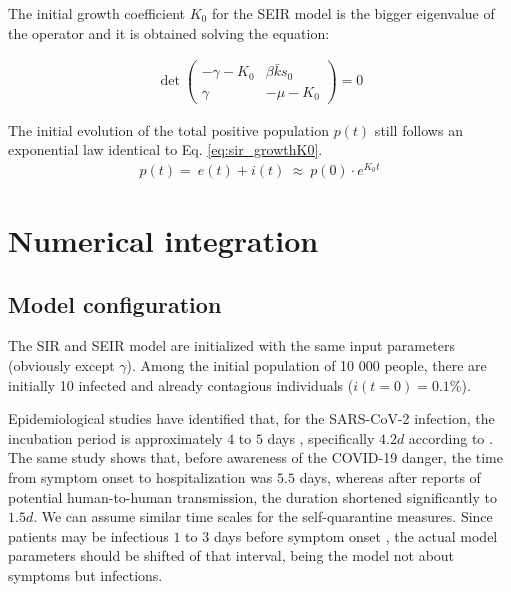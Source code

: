 \documentclass[DIV=12, BCOR=0pt]{scrartcl}  %
\begin{document}
The initial growth coefficient $K_0$ for the SEIR model is the bigger eigenvalue of the operator and it is obtained solving the equation: 

	\begin{align}
		\det 
		\begin{pmatrix}
			- \gamma - K_0 & \beta \bar{k} s_0\\ %
			\gamma & - \mu - K_0  %
		\end{pmatrix} = 0
	\label{eq:seir_K0}
	\end{align}
 
 The initial evolution of the total positive population $p(t)$ still follows an exponential law identical to Eq. \ref{eq:sir_growthK0}.
 \begin{align}
		p(t) = \ e(t) + i(t) \ \approx \  p(0) \cdot e^{K_0 t}
 \end{align}

 
	\section{Numerical integration}
	\label{sec:numerical}
	
  \subsection{Model configuration}
	The SIR and SEIR model are initialized with the same input parameters (obviously except $\gamma$). Among the initial population of 10 000 people, there are initially 10 infected and already contagious individuals ($i(t \! = \! 0) = 0.1 \%$).
	
	Epidemiological studies have identified that, for the SARS-CoV-2 infection, the incubation period is approximately $4$ to $5$ days \citep{Gandhi2020}, specifically $4.2 d$ according to \citet{Sanche2020}. The same study shows that, before awareness of the COVID-19 danger, the time from symptom onset to hospitalization was $5.5$ days, whereas after reports of potential human-to-human transmission, the duration shortened significantly to $1.5 d$. We can assume similar time scales for the self-quarantine measures. Since patients may be infectious $1$ to $3$ days before symptom onset \citep{Gandhi2020}, the actual model parameters should be shifted of that interval, being the model not about symptoms but infections. 
	
\end{document}
